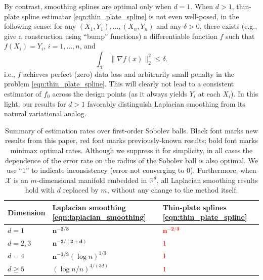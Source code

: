 \documentclass[twoside]{article}
\newcommand{\Reals}{\mathbb{R}}
\newcommand{\1}{\mathbf{1}}
\newcommand{\Rd}{\Reals^d}
\newcommand{\Xset}{\mathcal{X}}
\theoremstyle{definition}
\theoremstyle{remark}
\begin{document}
By contrast, smoothing splines are optimal only when $d=1$. When $d>1$, thin-plate spline estimator \eqref{eqn:thin_plate_spline} is not even well-posed, in the following sense: for any $(X_1,Y_1),\ldots,(X_n,Y_n)$ and any $\delta>0$, there exists (e.g., \citet{green93} give a construction using ``bump'' functions) a differentiable function $f$ such that $f(X_i) = Y_i$, $i=1,\ldots,n$, and
\begin{equation*}
\int_{\Xset} \|\nabla f(x)\|_2^2 \leq \delta.
\end{equation*}
i.e., $f$ achieves perfect (zero) data loss and arbitrarily small penalty in the problem \eqref{eqn:thin_plate_spline}. This will clearly not lead to a consistent estimator of $f_0$ across the design points (as it always yields $Y_i$ at each $X_i$). In this light, our results for $d>1$ favorably distinguish Laplacian smoothing from its natural variational analog.

\begin{table}
	\begin{center}
		\begin{tabular}{p{} | p{} p{} }
			Dimension & Laplacian smoothing \eqref{eqn:laplacian_smoothing} & Thin-plate splines \eqref{eqn:thin_plate_spline} \\
			\hline
			$d = 1$ & $\bm{n^{-2/3}}$ & \textcolor{red}{$\bm{n^{-2/3}}$} \\
			$d = 2,3$ & $\bm{n^{-2/(2 + d)}}$ & \textcolor{red}{$1$} \\
			$d = 4$ & $\bm{n^{-1/3}} (\log n)^{1/3}$ & \textcolor{red}{$1$} \\
			$d \geq 5$  & $(\log n/n)^{4/(3d)}$ &\textcolor{red}{$1$} \\
		\end{tabular}
	\end{center}
	\caption{Summary of estimation rates over first-order Sobolev balls. Black font marks new results from this paper, red font marks previously-known results; bold font marks minimax optimal rates. Although we suppress it for simplicity, in all cases the dependence of the error rate on the radius of the Sobolev ball is also optimal. We use ``$1$'' to indicate inconsistency (error not converging to 0). Furthermore, when $\Xset$ is an $m$-dimensional manifold embedded in $\Rd$, all Laplacian smoothing results hold with $d$ replaced by $m$, without any change to the method itself.}
	\label{tbl:estimation_rates}
\end{table}
\end{document}
